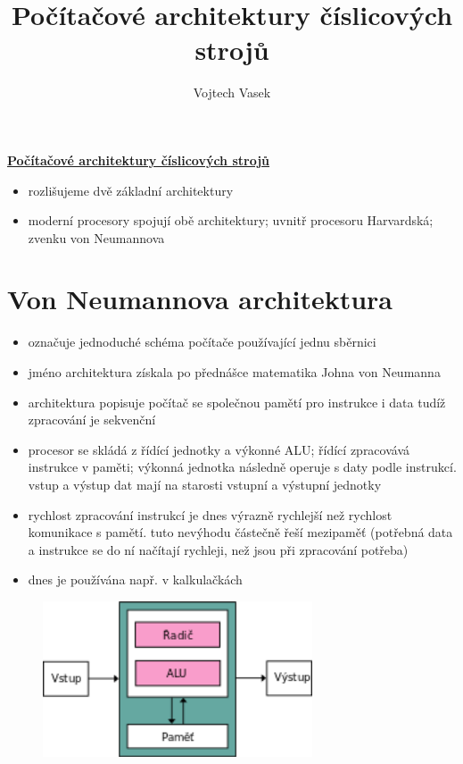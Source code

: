\documentclass[a4paper,12pt]{article}
\title{Počítačové architektury číslicových strojů}
\author{Vojtech Vasek}
\begin{document}
\begin{center}
    \huge{\underline{\textbf{Počítačové architektury číslicových strojů}}}
\end{center}
\begin{itemize}
    \item{rozlišujeme dvě základní architektury}
    \item{moderní procesory spojují obě architektury; uvnitř procesoru Harvardská; zvenku von Neumannova}
\end{itemize}

\section{Von Neumannova architektura}
    \begin{itemize}
        \item{označuje jednoduché schéma počítače používající jednu sběrnici}
        \item{jméno architektura získala po přednášce matematika Johna von Neumanna}
        \item{architektura popisuje počítač se společnou pamětí pro instrukce i data tudíž zpracování je sekvenční}
        \item{procesor se skládá z řídící jednotky a výkonné ALU; řídící zpracovává instrukce v paměti; výkonná jednotka následně operuje s daty podle instrukcí. vstup a výstup dat mají na starosti vstupní a výstupní jednotky}
        \item{rychlost zpracování instrukcí je dnes výrazně rychlejší než rychlost komunikace s pamětí. tuto nevýhodu částečně řeší mezipaměť (potřebná data a instrukce se do ní načítají rychleji, než jsou při zpracování potřeba)}
        \item{dnes je používána např. v kalkulačkách}
    \end{itemize}
    \begin{figure}[htp]
        \centering
        \includegraphics[width=8cm]{TVP_1_10_23@3.png}
    \end{figure}
\end{document}
